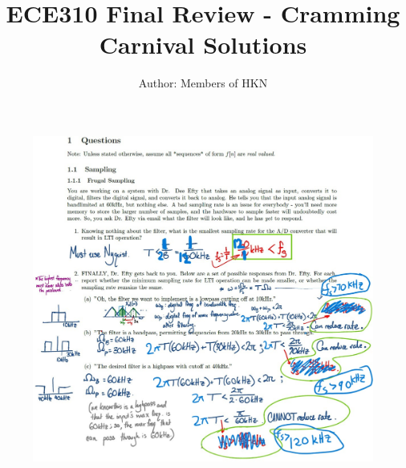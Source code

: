 \documentclass{article}
\title{ECE310 Final Review - Cramming Carnival Solutions}
\author{Author: Members of HKN}
\date{}
\begin{document}
\maketitle

\begin{figure}[h]
\begin{center}
    \includegraphics[width=0.96 \textwidth]{figures/Solutions pg 1.jpg}
    \label{fig:old_solutions_1}
\end{center}
\end{figure}

\newpage
\end{document}
